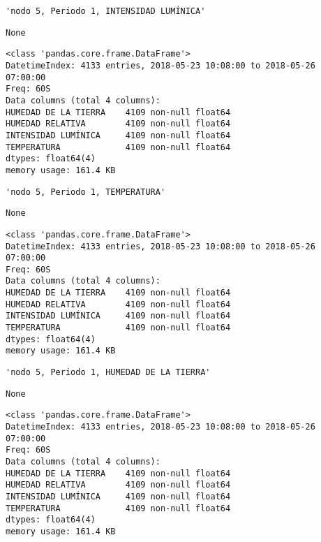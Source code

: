 \documentclass[11pt]{article}
\begin{document}
    
    \begin{verbatim}
'nodo 5, Periodo 1, INTENSIDAD LUMÍNICA'
    \end{verbatim}

    
    
    \begin{verbatim}
None
    \end{verbatim}

    
    \begin{Verbatim}[commandchars=\\\{\}]
<class 'pandas.core.frame.DataFrame'>
DatetimeIndex: 4133 entries, 2018-05-23 10:08:00 to 2018-05-26 07:00:00
Freq: 60S
Data columns (total 4 columns):
HUMEDAD DE LA TIERRA    4109 non-null float64
HUMEDAD RELATIVA        4109 non-null float64
INTENSIDAD LUMÍNICA     4109 non-null float64
TEMPERATURA             4109 non-null float64
dtypes: float64(4)
memory usage: 161.4 KB

    \end{Verbatim}

    
    \begin{verbatim}
'nodo 5, Periodo 1, TEMPERATURA'
    \end{verbatim}

    
    
    \begin{verbatim}
None
    \end{verbatim}

    
    \begin{Verbatim}[commandchars=\\\{\}]
<class 'pandas.core.frame.DataFrame'>
DatetimeIndex: 4133 entries, 2018-05-23 10:08:00 to 2018-05-26 07:00:00
Freq: 60S
Data columns (total 4 columns):
HUMEDAD DE LA TIERRA    4109 non-null float64
HUMEDAD RELATIVA        4109 non-null float64
INTENSIDAD LUMÍNICA     4109 non-null float64
TEMPERATURA             4109 non-null float64
dtypes: float64(4)
memory usage: 161.4 KB

    \end{Verbatim}

    
    \begin{verbatim}
'nodo 5, Periodo 1, HUMEDAD DE LA TIERRA'
    \end{verbatim}

    
    
    \begin{verbatim}
None
    \end{verbatim}

    
    \begin{Verbatim}[commandchars=\\\{\}]
<class 'pandas.core.frame.DataFrame'>
DatetimeIndex: 4133 entries, 2018-05-23 10:08:00 to 2018-05-26 07:00:00
Freq: 60S
Data columns (total 4 columns):
HUMEDAD DE LA TIERRA    4109 non-null float64
HUMEDAD RELATIVA        4109 non-null float64
INTENSIDAD LUMÍNICA     4109 non-null float64
TEMPERATURA             4109 non-null float64
dtypes: float64(4)
memory usage: 161.4 KB

    \end{Verbatim}
\end{document}
